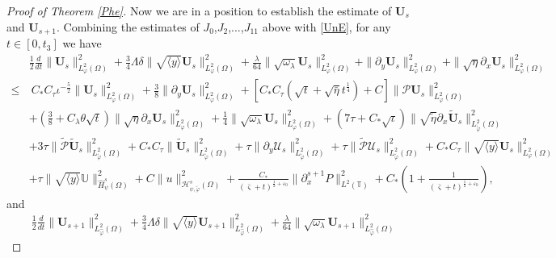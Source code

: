 \documentclass[10pt,a4paper]{amsart}
\newcommand\y{{{\langle y \rangle}}}
\begin{document}
\begin{proof}[Proof of Theorem \ref{Phe}]
Now we are in a position to establish the estimate of $\mathbf{U}_{s}$ and $\mathbf{U}_{s+1}$. Combining the estimates of $J_{0}$,$J_{2}$,...,$J_{11}$ above with \eqref{UnE}, for any $t\in[0,t_{3}]$ we have
\begin{align*}
&\frac{1}{2}\frac{d}{dt}\|\mathbf{U}_{s}\|_{L_{\varphi}^{2}(\Omega)}^{2}
+\frac{3}{4}\Lambda\delta\|\sqrt{\y}\mathbf{U}_{s}\|_{L_{\varphi}^{2}(\Omega)}^{2}
+\frac{\lambda}{64}\|\sqrt{\omega_{\lambda}}\mathbf{U}_{s}\|_{L_{\varphi}^{2}(\Omega)}^{2}
+\|\partial_{y}\mathbf{U}_{s}\|_{L_{\varphi}^{2}(\Omega)}^{2}
+\|\sqrt{\eta}\partial_{x}\mathbf{U}_{s}\|_{L_{\varphi}^{2}(\Omega)}^{2}\\
\leq&~C_{*}C_{\tau}\iota^{-\frac{5}{2}}\|\mathbf{U}_{s}\|_{L_{\varphi}^{2}(\Omega)}^{2}
     +\frac{3}{8}\|\partial_{y}\mathbf{U}_{s}\|_{L_{\varphi}^{2}(\Omega)}^{2}
     +\left[C_{*}C_{\tau}(\sqrt{t}+\sqrt{\bar{\eta}}t^{\frac{1}{4}})+C\right]\|\mathcal{P}\mathbf{U}_{s}\|_{L_{\varphi}^{2}(\Omega)}^{2}\\
    &+\left(\frac{3}{8}+C_{\lambda}\theta\sqrt{t}\right)\|\sqrt{\eta}\partial_{x}\mathbf{U}_{s}\|_{L_{\varphi}^{2}(\Omega)}^{2}
     +\frac{1}{4}\|\sqrt{\omega_{\lambda}}\mathbf{U}_{s}\|_{L_{\varphi}^{2}(\Omega)}^{2}
     +(7\tau+C_{*}\sqrt{\iota})\|\sqrt{\tilde{\eta}}\partial_{x}\tilde{\mathbf{U}}_{s}\|_{L_{\tilde{\varphi}}^{2}(\Omega)}^{2}\\
    &+3\tau\|\tilde{\mathcal{P}}\tilde{\mathbf{U}}_{s}\|_{L_{\tilde{\varphi}}^{2}(\Omega)}^{2}
     +C_{*}C_{\tau}\|\tilde{\mathbf{U}}_{s}\|_{L_{\tilde{\varphi}}^{2}(\Omega)}^{2}
     +\tau\|\partial_{y}\mathcal{U}_{s}\|_{L_{\tilde{\varphi}}^{2}(\Omega)}^{2}
     +\tau\|\tilde{\mathcal{P}}\mathcal{U}_{s}\|_{L_{\tilde{\varphi}}^{2}(\Omega)}^{2}
     +C_{*}C_{\tau}\|\sqrt{\y}\mathbf{U}_{s}\|_{L_{\varphi}^{2}(\Omega)}^{2}\\
    &+\tau\|\sqrt{\y}\mathbb{U}\|_{\hat{H}_{\psi}^{s}(\Omega)}^{2}
     +C\|u\|_{\mathcal{H}_{\psi,\tilde{\varphi}}^{s}(\Omega)}^{2}
     +\frac{C_{*}}{(\bar{\varsigma}+t)^{\frac{1}{2}+\varepsilon_{0}}}\|\partial_{x}^{s+1}P\|_{L^{2}(\mathbb{T})}^{2}
     +C_{*}\left(1+\frac{1}{(\bar{\varsigma}+t)^{\frac{1}{2}+\varepsilon_{0}}}\right),
\end{align*}
and
\begin{align*}
&\frac{1}{2}\frac{d}{dt}\|\mathbf{U}_{s+1}\|_{L_{\hat{\varphi}}^{2}(\Omega)}^{2}
+\frac{3}{4}\Lambda\delta\|\sqrt{\y}\mathbf{U}_{s+1}\|_{L_{\hat{\varphi}}^{2}(\Omega)}^{2}
+\frac{\lambda}{64}\|\sqrt{\omega_{\lambda}}\mathbf{U}_{s+1}\|_{L_{\hat{\varphi}}^{2}(\Omega)}^{2}

\end{align*}
\end{proof}
\end{document}
